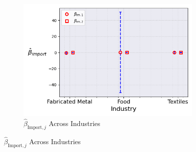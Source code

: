 \documentclass{article}
\begin{document}
\begin{figure}[ht!]
\begin{subfigure}[t]{0.32\textwidth}
        \includegraphics[width=\textwidth]{figure/stationary_mixture_kmshare_ciiu_beta_im_across_industries_m2.png}
        \caption{$\hat{\beta}_{\text{Import},j}$ Across Industries}
    \end{subfigure}
\end{figure}
\end{document}
